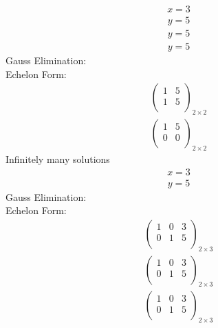 \documentclass{article}
\begin{document}
\begin{align*}
x=3\end{align*}
\begin{align*}
y=5\end{align*}
\begin{align*}
y=5\end{align*}
\begin{align*}
y=5\end{align*}
Gauss Elimination:\\
Echelon Form:\\
\begin{align*}
\left(
\begin{array}{c|c}
1 & 5\\
1 & 5\\
\end{array}
\right)_{2\times 2}
\end{align*}
\begin{align*}
\left(
\begin{array}{c|c}
1 & 5\\
0 & 0\\
\end{array}
\right)_{2\times 2}
\end{align*}
Infinitely many solutions\\
\begin{align*}
x=3\end{align*}
\begin{align*}
y=5\end{align*}
Gauss Elimination:\\
Echelon Form:\\
\begin{align*}
\left(
\begin{array}{cc|c}
1 & 0 & 3\\
0 & 1 & 5\\
\end{array}
\right)_{2\times 3}
\end{align*}
\begin{align*}
\left(
\begin{array}{cc|c}
1 & 0 & 3\\
0 & 1 & 5\\
\end{array}
\right)_{2\times 3}
\end{align*}
\begin{align*}
\left(
\begin{array}{cc|c}
1 & 0 & 3\\
0 & 1 & 5\\
\end{array}
\right)_{2\times 3}
\end{align*}
\end{document}
